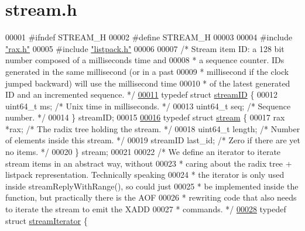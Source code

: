 \hypertarget{stream_8h_source}{}\section{stream.\+h}
\label{stream_8h_source}

\begin{DoxyCode}
00001 \textcolor{preprocessor}{#}\textcolor{preprocessor}{ifndef} \textcolor{preprocessor}{STREAM\_H}
00002 \textcolor{preprocessor}{#}\textcolor{preprocessor}{define} \textcolor{preprocessor}{STREAM\_H}
00003 
00004 \textcolor{preprocessor}{#}\textcolor{preprocessor}{include} \hyperlink{rax_8h}{"rax.h"}
00005 \textcolor{preprocessor}{#}\textcolor{preprocessor}{include} \hyperlink{listpack_8h}{"listpack.h"}
00006 
00007 \textcolor{comment}{/* Stream item ID: a 128 bit number composed of a milliseconds time and}
00008 \textcolor{comment}{ * a sequence counter. IDs generated in the same millisecond (or in a past}
00009 \textcolor{comment}{ * millisecond if the clock jumped backward) will use the millisecond time}
00010 \textcolor{comment}{ * of the latest generated ID and an incremented sequence. */}
\hyperlink{structstreamID}{00011} \textcolor{keyword}{typedef} \textcolor{keyword}{struct} \hyperlink{structstreamID}{streamID} \{
00012     uint64\_t ms;        \textcolor{comment}{/* Unix time in milliseconds. */}
00013     uint64\_t seq;       \textcolor{comment}{/* Sequence number. */}
00014 \} streamID;
00015 
\hyperlink{structstream}{00016} \textcolor{keyword}{typedef} \textcolor{keyword}{struct} \hyperlink{structstream}{stream} \{
00017     rax *rax;               \textcolor{comment}{/* The radix tree holding the stream. */}
00018     uint64\_t length;        \textcolor{comment}{/* Number of elements inside this stream. */}
00019     streamID last\_id;       \textcolor{comment}{/* Zero if there are yet no items. */}
00020 \} stream;
00021 
00022 \textcolor{comment}{/* We define an iterator to iterate stream items in an abstract way, without}
00023 \textcolor{comment}{ * caring about the radix tree + listpack representation. Technically speaking}
00024 \textcolor{comment}{ * the iterator is only used inside streamReplyWithRange(), so could just}
00025 \textcolor{comment}{ * be implemented inside the function, but practically there is the AOF}
00026 \textcolor{comment}{ * rewriting code that also needs to iterate the stream to emit the XADD}
00027 \textcolor{comment}{ * commands. */}
\hyperlink{structstreamIterator}{00028} \textcolor{keyword}{typedef} \textcolor{keyword}{struct} \hyperlink{structstreamIterator}{streamIterator} \{

\end{DoxyCode}
